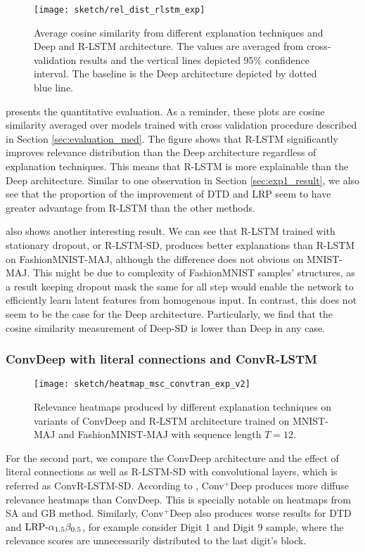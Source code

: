  \begin{figure}[!htb]
\centering
\texttt{[image: sketch/rel\_dist\_rlstm\_exp]}
\caption{Average cosine similarity from different explanation techniques and Deep and R-LSTM architecture. The values are averaged from cross-validation results and the vertical lines depicted 95\% confidence interval. The baseline is the Deep architecture depicted by dotted blue line.} 
\label{fig:rel_dist_rlstm_exp}
\end{figure}

\addfigure{\ref{fig:rel_dist_rlstm_exp}} presents the quantitative evaluation. As a reminder, these plots are cosine similarity averaged over models trained with cross validation procedure described in  Section \ref{sec:evaluation_med}. The figure shows that R-LSTM significantly improves relevance distribution than the Deep architecture regardless of explanation techniques.  This means that R-LSTM is more explainable than the Deep architecture. Similar to one observation in Section \ref{sec:exp1_result}, we also see that the proportion of the improvement of DTD and LRP seem to have greater advantage from R-LSTM than the other methods.  

\addfigure{\ref{fig:rel_dist_rlstm_exp}}  also shows another interesting result. We can see that R-LSTM trained with stationary dropout, or R-LSTM-SD, produces better explanations than R-LSTM on FashionMNIST-MAJ, although the difference does not obvious on MNIST-MAJ. This might be due to complexity of FashionMNIST samples' structures, as a result keeping dropout mask the same for all step would enable the network to efficiently learn latent features from homogenous input. In contrast, this does not seem to be the case for the Deep architecture. Particularly, we find that the cosine similarity measurement of Deep-SD is lower than Deep in any case.

\clearpage

\subsubsection{ConvDeep with literal connections and ConvR-LSTM}
 \begin{figure}[!htb]
\centering
\texttt{[image: sketch/heatmap\_msc\_convtran\_exp\_v2]}
\caption{Relevance heatmaps produced by different explanation techniques on variants of ConvDeep and R-LSTM architecture trained on MNIST-MAJ and FashionMNIST-MAJ with sequence length $T=12$. \heatmapscaleexplain} 
\label{fig:heatmap_msc_convtran_exp}
\end{figure}
For the second part, we compare the ConvDeep architecture and the effect of literal connections as well as R-LSTM-SD with convolutional layers, which is referred as ConvR-LSTM-SD. According to \addfigure{\ref{fig:heatmap_msc_convtran_exp}}, Conv$^+$Deep produces more diffuse relevance heatmaps than ConvDeep. This is specially notable on heatmaps from SA  and GB method. Similarly, Conv$^+$Deep also produces worse results for DTD and $\text{LRP-}\alpha_{1.5}\beta_{0.5}$, for example consider Digit 1 and Digit 9 sample, where the relevance scores are unnecessarily distributed to the last digit's block. 

